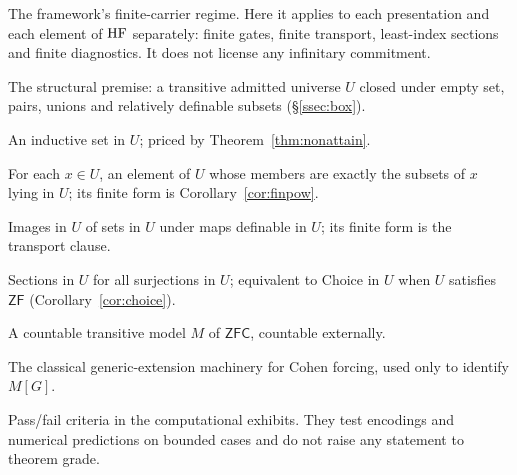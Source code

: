 \begin{description}[style=multiline,leftmargin=!,labelwidth=0.27\textwidth,labelsep=0.8em,itemsep=3pt]
\item[\textbf{A\_FIN}.] The framework's finite-carrier regime. Here it applies to each
presentation and each element of $\mathrm{HF}$ separately: finite gates, finite transport, least-index
sections and finite diagnostics. It does not license any infinitary commitment.
\item[\textbf{(S)}.] The structural premise: a transitive admitted universe $U$ closed under empty
set, pairs, unions and relatively definable subsets (\S\ref{ssec:box}).
\item[\textbf{C-INF}.] An inductive set in $U$; priced by Theorem~\ref{thm:nonattain}.
\item[\textbf{C-POW}.] For each $x\in U$, an element of $U$ whose members are exactly the subsets of
$x$ lying in $U$; its finite form is Corollary~\ref{cor:finpow}.
\item[\textbf{C-REPL}.] Images in $U$ of sets in $U$ under maps definable in $U$; its finite form
is the transport clause.
\item[\textbf{C-SEL}.] Sections in $U$ for all surjections in $U$; equivalent to Choice in $U$ when
$U$ satisfies $\mathsf{ZF}$ (Corollary~\ref{cor:choice}).
\item[\textbf{J1}.] A countable transitive model $M$ of $\mathsf{ZFC}$, countable externally.
\item[\textbf{J2}.] The classical generic-extension machinery for Cohen forcing, used only to
identify $M[G]$.
\item[Diagnostic gates.] Pass/fail criteria in the computational exhibits. They test encodings and
numerical predictions on bounded cases and do not raise any statement to theorem grade.
\end{description}
